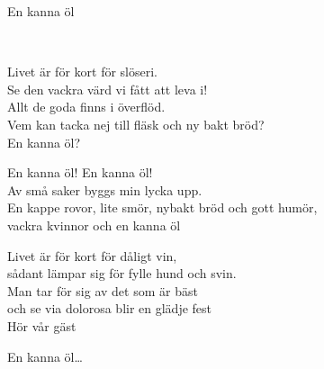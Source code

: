 \begin{song}{En kanna öl}
	
	
	\\
	
	Livet är för kort för slöseri.\\
	Se den vackra värd vi fått att leva i!\\
	Allt de goda finns i överflöd.\\
	Vem kan tacka nej till fläsk och ny bakt bröd?\\
	En kanna öl?

	En kanna öl! En kanna öl!\\
	Av små saker byggs min lycka upp.\\
	En kappe rovor, lite smör, nybakt bröd och gott humör,\\
	vackra kvinnor och en kanna öl

	Livet är för kort för dåligt vin,\\
	sådant lämpar sig för fylle hund och svin.\\
	Man tar för sig av det som är bäst\\
	och se via dolorosa blir en glädje fest\\
	Hör vår gäst

	En kanna öl\dots

	
\end{song}
